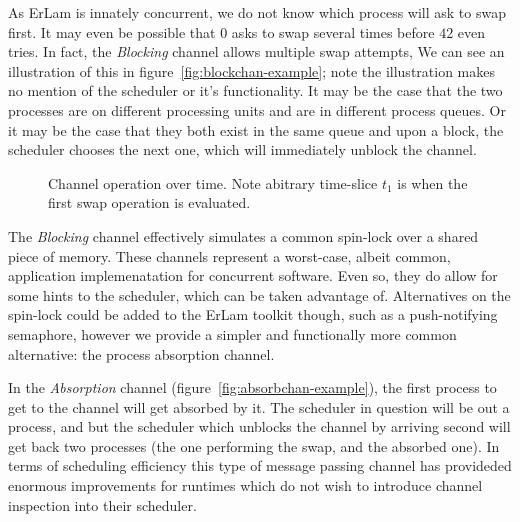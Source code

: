 As ErLam is innately concurrent, we do not know which process will ask to swap
first. It may even be possible that $0$ asks to swap several times before $42$
even tries. In fact, the {\sl Blocking} channel allows multiple swap attempts,
We can see an illustration of this in figure~\ref{fig:blockchan-example}; note
the illustration makes no mention of the scheduler or it's functionality. It may
be the case that the two processes are on different processing units and are in
different process queues. Or it may be the case that they both exist in the
same queue and upon a block, the scheduler chooses the next one, which will 
immediately unblock the channel.

\begin{figure}
\caption{Channel operation over time. Note abitrary time-slice $t_1$ is when the 
first swap operation is evaluated.}
\end{figure}

The {\sl Blocking} channel effectively simulates a common spin-lock over a shared 
piece of memory. These channels represent a worst-case, albeit common, application 
implemenatation for concurrent software. Even so, they do allow for some hints
to the scheduler, which can be taken advantage of. Alternatives on the spin-lock 
could be added to the ErLam toolkit though, such as a push-notifying semaphore, 
however we provide a simpler and functionally more common alternative: the process 
absorption channel.

In the {\sl Absorption} channel (figure~\ref{fig:absorbchan-example}), the first 
process to get to the channel will get absorbed by it. The scheduler in 
question will be out a process, and but the scheduler which unblocks the channel 
by arriving second will get back two processes (the one performing the swap, 
and the absorbed one). In terms of scheduling efficiency this type of message
passing channel has provideded enormous improvements for runtimes which do not
wish to introduce channel inspection into their scheduler.


